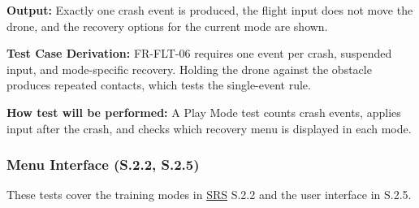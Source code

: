 \documentclass[12pt, titlepage]{article}
\begin{document}
{\begin{enumerate}
\textbf{Output:} Exactly one crash event is produced, the flight input does not move the
drone, and the recovery options for the current mode are shown.

\textbf{Test Case Derivation:} \mbox{FR-FLT-06} requires one event per crash, suspended
input, and mode-specific recovery. Holding the drone against the obstacle produces
repeated contacts, which tests the single-event rule.

\textbf{How test will be performed:} A Play Mode test counts crash events, applies input
after the crash, and checks which recovery menu is displayed in each mode.

\end{enumerate}
\par}

\subsubsection{Menu Interface (S.2.2, S.2.5)}

These tests cover the training modes in \hyperlink{abbr:SRS}{SRS} S.2.2 and the user interface in S.2.5.
\end{document}
